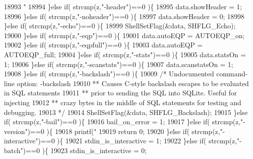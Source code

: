 \begin{DoxyCode}
{{{{{{18993                        \textcolor{stringliteral}{"%
18994     \}\textcolor{keywordflow}{else} \textcolor{keywordflow}{if}( strcmp(z,\textcolor{stringliteral}{"-header"})==0 )\{
18995       data.showHeader = 1;
18996     \}\textcolor{keywordflow}{else} \textcolor{keywordflow}{if}( strcmp(z,\textcolor{stringliteral}{"-noheader"})==0 )\{
18997       data.showHeader = 0;
18998     \}\textcolor{keywordflow}{else} \textcolor{keywordflow}{if}( strcmp(z,\textcolor{stringliteral}{"-echo"})==0 )\{
18999       ShellSetFlag(&data, SHFLG_Echo);
19000     \}\textcolor{keywordflow}{else} \textcolor{keywordflow}{if}( strcmp(z,\textcolor{stringliteral}{"-eqp"})==0 )\{
19001       data.autoEQP = AUTOEQP_on;
19002     \}\textcolor{keywordflow}{else} \textcolor{keywordflow}{if}( strcmp(z,\textcolor{stringliteral}{"-eqpfull"})==0 )\{
19003       data.autoEQP = AUTOEQP_full;
19004     \}\textcolor{keywordflow}{else} \textcolor{keywordflow}{if}( strcmp(z,\textcolor{stringliteral}{"-stats"})==0 )\{
19005       data.statsOn = 1;
19006     \}\textcolor{keywordflow}{else} \textcolor{keywordflow}{if}( strcmp(z,\textcolor{stringliteral}{"-scanstats"})==0 )\{
19007       data.scanstatsOn = 1;
19008     \}\textcolor{keywordflow}{else} \textcolor{keywordflow}{if}( strcmp(z,\textcolor{stringliteral}{"-backslash"})==0 )\{
19009       \textcolor{comment}{/* Undocumented command-line option: -backslash}
19010 \textcolor{comment}{      ** Causes C-style backslash escapes to be evaluated in SQL statements}
19011 \textcolor{comment}{      ** prior to sending the SQL into SQLite.  Useful for injecting}
19012 \textcolor{comment}{      ** crazy bytes in the middle of SQL statements for testing and debugging.}
19013 \textcolor{comment}{      */}
19014       ShellSetFlag(&data, SHFLG_Backslash);
19015     \}\textcolor{keywordflow}{else} \textcolor{keywordflow}{if}( strcmp(z,\textcolor{stringliteral}{"-bail"})==0 )\{
19016       bail_on_error = 1;
19017     \}\textcolor{keywordflow}{else} \textcolor{keywordflow}{if}( strcmp(z,\textcolor{stringliteral}{"-version"})==0 )\{
19018       printf(\textcolor{stringliteral}{"%
19019       \textcolor{keywordflow}{return} 0;
19020     \}\textcolor{keywordflow}{else} \textcolor{keywordflow}{if}( strcmp(z,\textcolor{stringliteral}{"-interactive"})==0 )\{
19021       stdin_is_interactive = 1;
19022     \}\textcolor{keywordflow}{else} \textcolor{keywordflow}{if}( strcmp(z,\textcolor{stringliteral}{"-batch"})==0 )\{
19023       stdin_is_interactive = 0;
}}}}}}}}
\end{DoxyCode}
